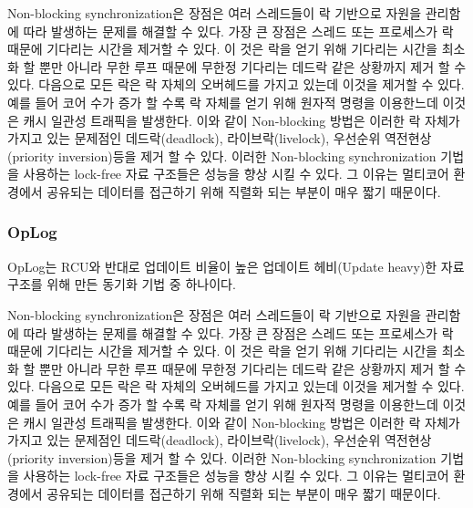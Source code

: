 

Non-blocking synchronization은 장점은 여러 스레드들이 락 기반으로 자원을 관리함에 따라
 발생하는 문제를 해결할 수 있다. 
가장 큰 장점은 스레드 또는 프로세스가 락 때문에 기다리는 시간을 제거할 수 있다.
이 것은 락을 얻기 위해 기다리는 시간을 최소화 할 뿐만 아니라 무한 루프 때문에 무한정 기다리는 
데드락 같은 상황까지 제거 할 수 있다. 
다음으로 모든 락은 락 자체의 오버헤드를 가지고 있는데 이것을 제거할 수 있다. 
예를 들어 코어 수가 증가 할 수록 락 자체를 얻기 위해 원자적 명령을 이용한느데 이것은 캐시 일관성 트래픽을 
발생한다. 
이와 같이 Non-blocking 방법은 이러한 락 자체가 가지고 있는 문제점인 데드락(deadlock), 라이브락(livelock), 
우선순위 역전현상(priority inversion)등을 제거 할 수 있다. 
이러한 Non-blocking synchronization 기법을 사용하는 lock-free 자료 구조들은 성능을 향상 시킬 수 있다. 
그 이유는 멀티코어 환경에서 공유되는 데이터를 접근하기 위해 직렬화 되는 부분이 매우 짧기 때문이다. 




\subsubsection{OpLog}

OpLog는 RCU와 반대로 업데이트 비율이 높은 업데이트 헤비(Update heavy)한 자료구조를 위해 만든 
동기화 기법 중 하나이다.

Non-blocking synchronization은 장점은 여러 스레드들이 락 기반으로 자원을 관리함에 따라
 발생하는 문제를 해결할 수 있다. 
가장 큰 장점은 스레드 또는 프로세스가 락 때문에 기다리는 시간을 제거할 수 있다.
이 것은 락을 얻기 위해 기다리는 시간을 최소화 할 뿐만 아니라 무한 루프 때문에 무한정 기다리는 
데드락 같은 상황까지 제거 할 수 있다. 
다음으로 모든 락은 락 자체의 오버헤드를 가지고 있는데 이것을 제거할 수 있다. 
예를 들어 코어 수가 증가 할 수록 락 자체를 얻기 위해 원자적 명령을 이용한느데 이것은 캐시 일관성 트래픽을 
발생한다. 
이와 같이 Non-blocking 방법은 이러한 락 자체가 가지고 있는 문제점인 데드락(deadlock), 라이브락(livelock), 
우선순위 역전현상(priority inversion)등을 제거 할 수 있다. 
이러한 Non-blocking synchronization 기법을 사용하는 lock-free 자료 구조들은 성능을 향상 시킬 수 있다. 
그 이유는 멀티코어 환경에서 공유되는 데이터를 접근하기 위해 직렬화 되는 부분이 매우 짧기 때문이다. 


